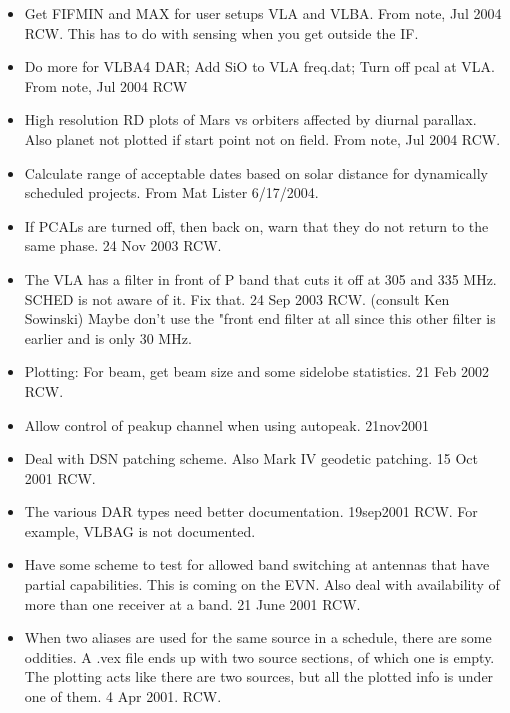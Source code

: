 \documentclass{report}
\begin{document}
\begin{itemize}
\item Get FIFMIN and MAX for user setups VLA and VLBA.  From note, Jul
      2004 RCW.  This has to do with sensing when you get outside the
      IF.

\item Do more for VLBA4 DAR;  Add SiO to VLA freq.dat; Turn off pcal
      at VLA.  From note, Jul 2004 RCW

\item High resolution RD plots of Mars vs orbiters affected by
      diurnal parallax.  Also planet not plotted if start point not on
      field.  From note, Jul 2004  RCW.

\item Calculate range of acceptable dates based on solar distance for
      dynamically scheduled projects.  From Mat Lister 6/17/2004.

\item If PCALs are turned off, then back on, warn that they do not
      return to the same phase.  24 Nov 2003 RCW.

\item The VLA has a filter in front of P band that cuts it off at
      305 and 335 MHz.  SCHED is not aware of it.  Fix that.  24 Sep 2003
      RCW.  (consult Ken Sowinski)  Maybe don't use the "front end
      filter at all since this other filter is earlier and is only
      30 MHz.

\item Plotting:  For beam, get beam size and some sidelobe statistics.
      21 Feb 2002 RCW.

\item Allow control of peakup channel when using autopeak.  21nov2001

\item Deal with DSN patching scheme.  Also Mark IV geodetic patching.
      15 Oct 2001  RCW.

\item The various DAR types need better documentation.  19sep2001 RCW.
      For example, VLBAG is not documented.

\item Have some scheme to test for allowed band switching at antennas
      that have partial capabilities.  This is coming on the EVN.
      Also deal with availability of more than one receiver at a band.
      21 June 2001  RCW.

\item When two aliases are used for the same source in a schedule, there
      are some oddities.  A .vex file ends up with two source sections,
      of which one is empty.  The plotting acts like there are two sources,
      but all the plotted info is under one of them.  4 Apr 2001.  RCW.


\end{itemize}
\end{document}

